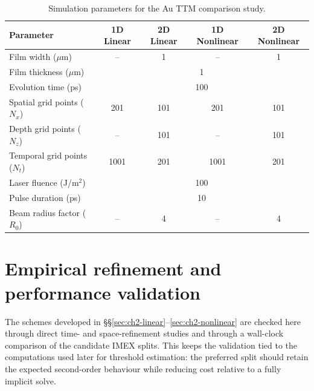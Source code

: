 \begin{table}[htbp]
    \centering
    \caption{Simulation parameters for the Au TTM comparison study.}
    \label{tab:ch2-sim-params}
    \begin{tabular}{@{}lcccc@{}}
        \toprule
        Parameter                      & 1D Linear               & 2D Linear & 1D Nonlinear & 2D Nonlinear \\
        \midrule
        Film width (\(\mu\)m)          & --                      & 1         & --           & 1            \\
        Film thickness (\(\mu\)m)      & \multicolumn{4}{c}{1}                                             \\
        Evolution time (ps)            & \multicolumn{4}{c}{100}                                           \\
        Spatial grid points (\(N_x\))  & 201                     & 101       & 201          & 101          \\
        Depth grid points (\(N_z\))    & --                      & 101       & --           & 101          \\
        Temporal grid points (\(N_t\)) & 1001                    & 201       & 1001         & 201          \\
        Laser fluence (J/m\(^2\))      & \multicolumn{4}{c}{100}                                           \\
        Pulse duration (ps)            & \multicolumn{4}{c}{10}                                            \\
        Beam radius factor (\(R_0\))   & --                      & 4         & --           & 4            \\
        \bottomrule
    \end{tabular}
\end{table}

\section{Empirical refinement and performance validation}
\label{sec:ch2-stability}

The schemes developed in \S\S\ref{sec:ch2-linear}--\ref{sec:ch2-nonlinear} are checked here through direct time- and space-refinement studies and through a wall-clock comparison of the candidate IMEX splits. This keeps the validation tied to the computations used later for threshold estimation: the preferred split should retain the expected second-order behaviour while reducing cost relative to a fully implicit solve.

